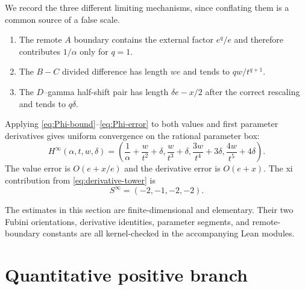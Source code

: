 \documentclass[12pt]{article}
\begin{document}
We record the three different limiting mechanisms, since conflating them is
a common source of a false scale.
\begin{enumerate}
\item The remote $A$ boundary contains the external factor $e^q/e$ and
therefore contributes $1/\alpha$ only for $q=1$.
\item The $B-C$ divided difference has length $we$ and tends to
$qw/t^{q+1}$.
\item The $D$--gamma half-shift pair has length $\delta e-x/2$ after the
correct rescaling and tends to $q\delta$.
\end{enumerate}
Applying \eqref{eq:Phi-bound}--\eqref{eq:Phi-error} to both values and first
parameter derivatives gives uniform convergence on the rational parameter
box:
\begin{equation}\label{eq:Hlimit}
 H^\infty(\alpha,t,w,\delta)=
 \left(
 \frac1\alpha+\frac w{t^2}+\delta,
 \frac w{t^3}+\delta,
 \frac{3w}{t^4}+3\delta,
 \frac{4w}{t^5}+4\delta
 \right).
\end{equation}
The value error is $O(e+x/e)$ and the derivative error is $O(e+x)$.
The xi contribution from \eqref{eq:derivative-tower} is
\begin{equation}\label{eq:Slimit}
 S^\infty=(-2,-1,-2,-2).
\end{equation}

The estimates in this section are finite-dimensional and elementary.  Their
two Fubini orientations, derivative identities, parameter segments, and
remote-boundary constants are all kernel-checked in the accompanying Lean
modules.

\section{Quantitative positive branch}\label{sec:branch}
\end{document}
